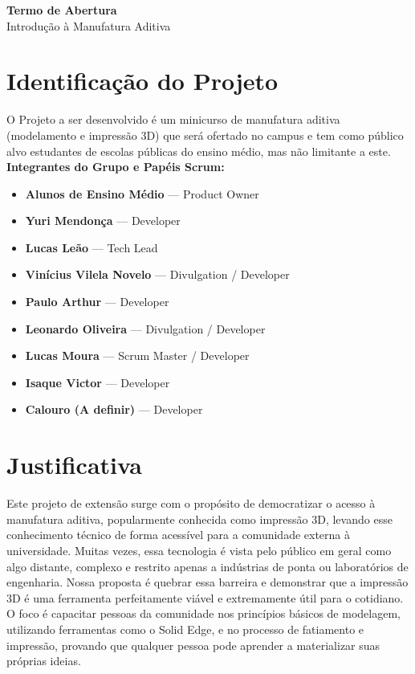 \documentclass[12pt, a4paper]{article}
\newcommand{\projetotitulo}{Introdução à Manufatura Aditiva}
\begin{document}
\begin{center}
    {\Large\bfseries Termo de Abertura\sprintnum}\\
    {\large \projetotitulo}\\
\end{center}

\section{Identificação do Projeto}

O Projeto a ser desenvolvido é um minicurso de manufatura aditiva (modelamento e impressão 3D) que será ofertado no campus e tem como público alvo estudantes de escolas públicas do ensino médio, mas não limitante a este. \\

\noindent \textbf{Integrantes do Grupo e Papéis Scrum:}
\begin{itemize}
    \item \textbf{Alunos de Ensino Médio} --- Product Owner
    \item \textbf{Yuri Mendonça} --- Developer
    \item \textbf{Lucas Leão} --- Tech Lead
    \item \textbf{Vinícius Vilela Novelo} --- Divulgation / Developer
    \item \textbf{Paulo Arthur} --- Developer
    \item \textbf{Leonardo Oliveira} --- Divulgation / Developer
    \item \textbf{Lucas Moura} --- Scrum Master / Developer
    \item \textbf{Isaque Victor} --- Developer
    \item \textbf{Calouro (A definir)} --- Developer
\end{itemize}

\section{Justificativa}
Este projeto de extensão surge com o propósito de democratizar o acesso à manufatura aditiva, popularmente conhecida como impressão 3D, levando esse conhecimento técnico de forma acessível para a comunidade externa à universidade. Muitas vezes, essa tecnologia é vista pelo público em geral como algo distante, complexo e restrito apenas a indústrias de ponta ou laboratórios de engenharia. Nossa proposta é quebrar essa barreira e demonstrar que a impressão 3D é uma ferramenta perfeitamente viável e extremamente útil para o cotidiano. O foco é capacitar pessoas da comunidade nos princípios básicos de modelagem, utilizando ferramentas como o Solid Edge, e no processo de fatiamento e impressão, provando que qualquer pessoa pode aprender a materializar suas próprias ideias.
\end{document}
